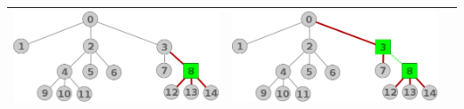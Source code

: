 \begin{center}
\begin{tabular}{ |c||c||c| }
			\includegraphics[scale = 0.3]{img/ej3/constructiva_golosa/tree_st11.png} &
			\includegraphics[scale = 0.3]{img/ej3/constructiva_golosa/tree_st12.png} \\
			\hline
		\end{tabular}
	\end{center}
			
